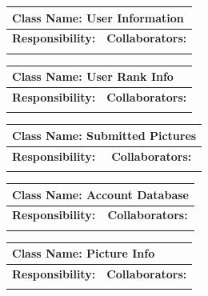 \documentclass[]{article}
\begin{document}
	\begin{table}[H]
		\centering
		\begin{tabular}{|p{5cm}|p{5cm}|}
		\hline 
		 \multicolumn{2}{|l|}{\textbf{Class Name:} User Information} \\
		\hline
		\textbf{Responsibility:} & \textbf{Collaborators:} \\
		\hline
		\vspace{1in} & \\
		\hline
		\end{tabular}
	\end{table}

	\begin{table}[H]
		\centering
		\begin{tabular}{|p{5cm}|p{5cm}|}
		\hline 
		 \multicolumn{2}{|l|}{\textbf{Class Name:} User Rank Info} \\
		\hline
		\textbf{Responsibility:} & \textbf{Collaborators:} \\
		\hline
		\vspace{1in} & \\
		\hline
		\end{tabular}
	\end{table}

	\begin{table}[H]
		\centering
		\begin{tabular}{|p{5cm}|p{5cm}|}
		\hline 
		 \multicolumn{2}{|l|}{\textbf{Class Name:} Submitted Pictures} \\
		\hline
		\textbf{Responsibility:} & \textbf{Collaborators:} \\
		\hline
		\vspace{1in} & \\
		\hline
		\end{tabular}
	\end{table}

	\begin{table}[H]
		\centering
		\begin{tabular}{|p{5cm}|p{5cm}|}
		\hline 
		 \multicolumn{2}{|l|}{\textbf{Class Name:} Account Database} \\
		\hline
		\textbf{Responsibility:} & \textbf{Collaborators:} \\
		\hline
		\vspace{1in} & \\
		\hline
		\end{tabular}
	\end{table}

	\begin{table}[H]
		\centering
		\begin{tabular}{|p{5cm}|p{5cm}|}
		\hline 
		 \multicolumn{2}{|l|}{\textbf{Class Name:} Picture Info} \\
		\hline
		\textbf{Responsibility:} & \textbf{Collaborators:} \\
		\hline
		\vspace{1in} & \\
		\hline
		\end{tabular}
	\end{table}
\end{document}
